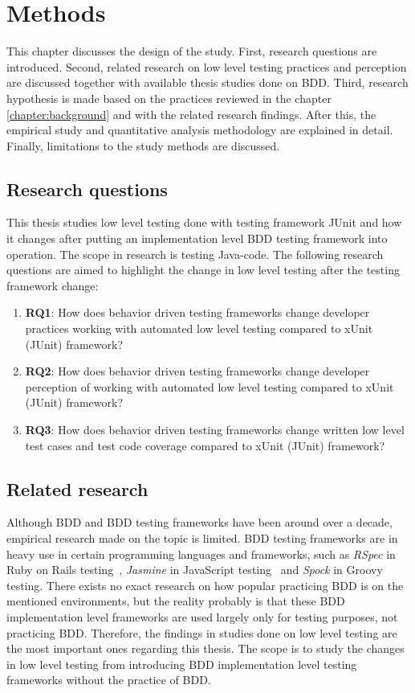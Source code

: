 \chapter{Methods}
\label{chapter:methods}
This chapter discusses the design of the study. First, research questions are introduced. Second, related research on low
level testing practices and perception are discussed together with available thesis studies done on BDD.
Third, research hypothesis is made based on the practices reviewed in the chapter \ref{chapter:background} and with the related research findings.
After this, the empirical study and quantitative analysis methodology are explained in detail. Finally, limitations
to the study methods are discussed.

\section{Research questions}
This thesis studies low level testing done with testing framework JUnit and how it changes after putting
an implementation level BDD testing framework into operation. The scope in research is testing Java-code. The following
research questions are aimed to highlight the change in low level testing after the testing framework change:
\begin{enumerate}
\item \textbf{RQ1}: How does behavior driven testing frameworks change developer practices working with automated low level testing compared to xUnit (JUnit) framework?
\item \textbf{RQ2}: How does behavior driven testing frameworks change developer perception of working with automated low level testing compared to xUnit (JUnit) framework?
\item \textbf{RQ3}: How does behavior driven testing frameworks change written low level test cases and test code coverage compared to xUnit (JUnit) framework?
\end{enumerate}

\section{Related research} %
    Although BDD and BDD testing frameworks have been around over a decade, empirical research made on the topic is limited.
    BDD testing frameworks are in heavy use in certain programming languages and frameworks, such as \textit{RSpec} in Ruby on Rails testing~\cite{lerner2009forge},
    \textit{Jasmine} in JavaScript testing~\cite{amodeo2015learning} and \textit{Spock} in Groovy testing. There exists no exact research on how
    popular practicing BDD is on the mentioned environments, but the reality probably is that these BDD implementation level
    frameworks are used largely only for testing purposes, not practicing BDD. Therefore, the findings in studies done on low level testing
    are the most important ones regarding this thesis. The scope is to study the changes in low level testing from introducing
    BDD implementation level testing frameworks without the practice of BDD.


